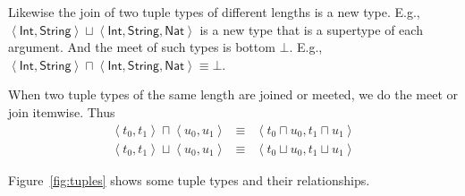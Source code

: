 \documentclass[12pt]{article}
\begin{document}
Likewise the join of two tuple types of different lengths is a new type.
E.g., $\left\langle \mathsf{Int},\mathsf{String}\right\rangle \sqcup
\left\langle \mathsf{Int},\mathsf{String},\mathsf{Nat}\right\rangle $ is a
new type that is a supertype of each argument. And the meet of such types is
bottom $\bot $. E.g.,$\left\langle \mathsf{Int},\mathsf{String}\right\rangle
\sqcap \left\langle \mathsf{Int},\mathsf{String},\mathsf{Nat}\right\rangle
\equiv \bot $.

When two tuple types of the same length are joined or meeted, we do the meet
or join itemwise. Thus 
\begin{eqnarray*}
\left\langle t_{0},t_{1}\right\rangle \sqcap \left\langle
u_{0},u_{1}\right\rangle &\equiv &\left\langle t_{0}\sqcap u_{0},t_{1}\sqcap
u_{1}\right\rangle \\
\left\langle t_{0},t_{1}\right\rangle \sqcup \left\langle
u_{0},u_{1}\right\rangle &\equiv &\left\langle t_{0}\sqcup u_{0},t_{1}\sqcup
u_{1}\right\rangle
\end{eqnarray*}

Figure~\ref{fig:tuples} shows some tuple types and their relationships.
\end{document}

